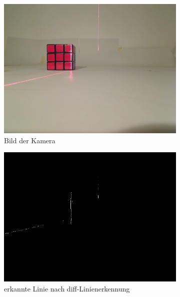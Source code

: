 \documentclass[ngerman,a4paper,parskip=half]{scrartcl}
\begin{document}
\begin{figure}[H]
	\centering
	\begin{subfigure}{0.32\textwidth}
		\includegraphics[width=\textwidth]{includes/red_0.png}
		\caption{Bild der Kamera\\}
		\label{fig:red_0_cam}
	\end{subfigure}
	\hfill
	\begin{subfigure}{0.32\textwidth}
		\includegraphics[width=\textwidth]{includes/red_0_diff.png}
		\caption{erkannte Linie nach diff-Linienerkennung}
		\label{fig:red_0_diff}
	\end{subfigure}
	\hfill
	\begin{subfigure}{0.32\textwidth}

\end{subfigure}
\end{figure}
\end{document}
